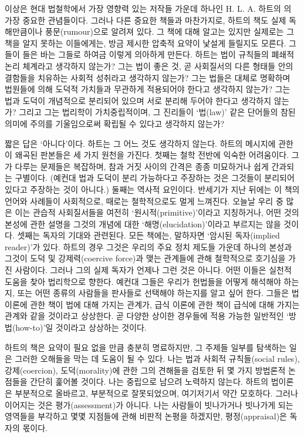 이상은 현대 법철학에서 가장 영향력 있는 저작들 가운데 하나인 H. L. A.
하트의 의 가장 중요한 관념들이다.
그러나 다른 중요한 책들과 마찬가지로, 하트의 책도 실제 독해만큼이나
풍문(rumour)으로 알려져 있다. 그 책에 대해 알고는 있지만 실제로는 그
책을 알지 못하는 이들에게는, 방금 제시한 압축적 요약이 낯설게 들릴지도
모른다. 그들이 들은 바는 그들로 하여금 이렇게 의아하게 만든다. 하트는
법이 규칙들의 폐쇄적 논리 체계라고 생각하지 않는가? 그는 법이 좋은 것,
곧 사회질서의 다른 형태들 안의 결함들을 치유하는 사회적 성취라고
생각하지 않는가? 그는 법들은 대체로 명확하며 법원들에 의해 도덕적
가치들과 무관하게 적용되어야 한다고 생각하지 않는가? 그는 법과 도덕이
개념적으로 분리되어 있으며 서로 분리해 두어야 한다고 생각하지 않는가?
그리고 그는 법리학이 가치중립적이며, 그 진리들이 ‘법(law)’ 같은 단어들의
참된 의미에 주의를 기울임으로써 확립될 수 있다고 생각하지 않는가?

짧은 답은 ‘아니다’이다. 하트는 그 어느 것도 생각하지 않는다. 하트의
메시지에 관한 이 왜곡된 판본들은 세 가지 원천을 가진다. 첫째는 철학
전반에 익숙한 어려움이다. 그가 다루는 문제들은 복잡하며, 참과 거짓
사이의 간격은 종종 미묘하거나 쉽게 간과되는 구별이다. (예컨대 법과
도덕이 분리 가능하다고 주장하는 것은 그것들이 분리되어 있다고 주장하는
것이 아니다.) 둘째는 역사적 요인이다. 반세기가 지난 뒤에는 이 책의
언어와 사례들이 사회적으로, 때로는 철학적으로도 멀게 느껴진다. 오늘날
우리 중 많은 이는 관습적 사회질서들을 여전히 ‘원시적(primitive)’이라고
지칭하거나, 어떤 것의 본성에 관한 설명을 그것의 개념에 대한
‘해명(elucidation)’이라고 부르지는 않을 것이다. 셋째는 독자의 기대와
관련된다. 모든 책에는, 말하자면 ‘암시된 독자(implied reader)’가 있다.
하트의 경우 그것은 우리의 주요 정치 제도들 가운데 하나의 본성과 그것이
도덕 및 강제력(coercive force)과 맺는 관계들에 관해 철학적으로 호기심을
가진 사람이다. 그러나 그의 실제 독자가 언제나 그런 것은 아니다. 어떤
이들은 실천적 도움을 찾아 법리학으로 향한다. 예컨대 그들은 우리가
헌법들을 어떻게 해석해야 하는지, 또는 어떤 종류의 사람들을 판사들로
선택해야 하는지를 알고 싶어 한다. 그들은 법이론에 관한 책이 법에 대해
가지는 관계가, 급식 이론에 관한 책이 급식에 대해 가지는 관계와 같을
것이라고 상상한다. 곧 다양한 상이한 경우들에 적용 가능한 일반적인
‘방법(how-to)’일 것이라고 상상하는 것이다.

하트의 책은 요약이 필요 없을 만큼 충분히 명료하지만, 그 주제들 일부를
탐색하는 일은 그러한 오해들을 막는 데 도움이 될 수 있다. 나는 법과
사회적 규칙들(social rules), 강제(coercion), 도덕(morality)에 관한 그의
견해들을 검토한 뒤 몇 가지 방법론적 논점들을 간단히 훑어볼 것이다. 나는
중립으로 남으려 노력하지 않는다. 하트의 법이론은 부분적으로 올바르고,
부분적으로 잘못되었으며, 여기저기서 약간 모호하다. 그러나 이어지는 것은
평가(assessment)가 아니다. 나는 사람들이 빗나가거나 빗나가게 되는
영역들을 부각하고 몇몇 지점들에 관해 비판적 논평을 하겠지만,
평정(appraisal)은 독자의 몫이다.


